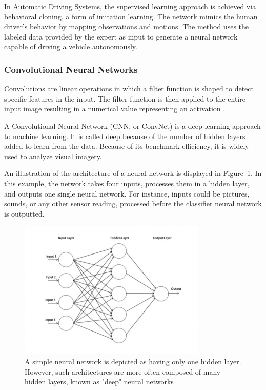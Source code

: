 \documentclass[12pt]{article}
\begin{document}
In Automatic Driving Systems, the supervised learning approach is achieved via behavioral cloning, a form of imitation learning. The network mimics the human driver's behavior by mapping observations and motions. The method uses the labeled data provided by the expert as input to generate a neural network capable of driving a vehicle autonomously.  

\subsubsection{Convolutional Neural Networks}

Convolutions are linear operations in which a filter function is shaped to detect specific features in the input. The filter function is then applied to the entire input image resulting in a numerical value representing an activation \parencite{nvidiacnn}.

A Convolutional Neural Network (CNN, or ConvNet) is a deep learning approach to machine learning. It is called deep because of the number of hidden layers added to learn from the data. Because of its benchmark efficiency, it is widely used to analyze visual imagery.

An illustration of the architecture of a neural network is displayed in  Figure~\ref{fig:figNeural}. In this example, the network takes four inputs, processes them in a hidden layer, and outputs one single neural network. For instance, inputs could be pictures, sounds, or any other sensor reading, processed before the classifier neural network is outputted.

\begin{figure} [ht] %
\begin{center}
\includegraphics[width=0.8\textwidth]{neural-network}
\caption{A simple neural network is depicted as having only one hidden layer. However, such architectures are more often composed of many hidden layers, known as "deep" neural networks \parencite{chang2018}.}
\label{fig:figNeural}
\end{center}
\end{figure}
\end{document}
